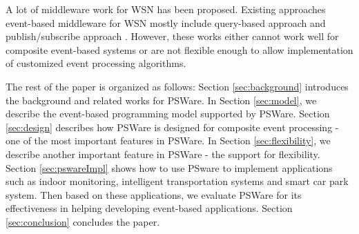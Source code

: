 A lot of middleware work for WSN has been proposed. Existing approaches event-based middleware for WSN mostly include query-based approach \cite{tinydb} and publish/subscribe approach \cite{complexevent}. However, these works either cannot work well for composite event-based systems or are not flexible enough to allow implementation of customized event processing algorithms. 



The rest of the paper is organized as follows: Section \ref{sec:background} introduces the background and related works for PSWare. In Section \ref{sec:model}, we describe the event-based programming model supported by PSWare. Section \ref{sec:design} describes how PSWare is designed for composite event processing - one of the most important features in PSWare. In Section \ref{sec:flexibility}, we describe another important feature in PSWare - the support for flexibility. Section \ref{sec:pswareImpl} shows how to use PSware to implement applications such as indoor monitoring, intelligent transportation systems and smart car park system. Then based on these applications, we evaluate PSWare for its effectiveness in helping developing event-based applications. Section \ref{sec:conclusion} concludes the paper.